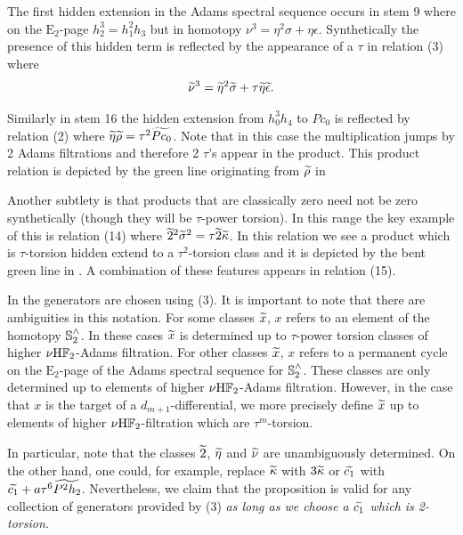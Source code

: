 \begin{rmk} \label{rmk:subtle-mult}
  The first hidden extension in the Adams spectral sequence occurs in stem 9 where on the $\mathrm{E}_2$-page $h_2^3 = h_1^2h_3$ but in homotopy $\nu^3 = \eta^2\sigma + \eta\epsilon$. Synthetically the presence of this hidden term is reflected by the appearance of a $\tau$ in relation (3) where
  \[ \wt{\nu}^3 = \wt{\eta}^2 \wt{\sigma} + \tau \wt{\eta} \wt{\epsilon}. \]

  Similarly in stem 16 the hidden extension from $h_0^3h_4$ to $Pc_0$ is reflected by relation (2) where $ \wt{\eta} \wt{\rho}  = \tau^2 \wt{Pc_0} $. Note that in this case the multiplication jumps by 2 Adams filtrations and therefore 2 $\tau$'s appear in the product. This product relation is depicted by the green line originating from $\wt{\rho}$ in 

  Another subtlety is that products that are classically zero need not be zero synthetically (though they will be $\tau$-power torsion). In this range the key example of this is relation (14) where $\wt{2}^2 \wt{\sigma}^2 = \tau \wt{2} \wt{\kappa}$. In this relation we see a product which is $\tau$-torsion hidden extend to a $\tau^2$-torsion class and it is depicted by the bent green line in . A combination of these features appears in relation (15). 
\end{rmk}


\begin{rmk}
In  the generators are chosen using (3).
It is important to note that there are ambiguities in this notation.
For some classes $\wt{x}$, $x$ refers to an element of the homotopy $\operatorname{\mathbb{S}}^{\wedge}_2$.  In these cases $\wt{x}$ is determined up to $\tau$-power torsion classes of higher $\nu \mathrm{H}\mathbb{F}_2$-Adams filtration.
For other classes $\wt{x}$, $x$ refers to a permanent cycle on the $\mathrm{E}_2$-page of the Adams spectral sequence for $\operatorname{\mathbb{S}}^{\wedge}_2$.  These classes are only determined up to elements of higher $\nu \mathrm{H}\mathbb{F}_2$-Adams filtration.  However, in the case that $x$ is the target of a $d_{m+1}$-differential, we more precisely define $\wt{x}$ up to elements of higher $\nu \mathrm{H}\mathbb{F}_2$-filtration which are $\tau^m$-torsion.

In particular, note that the classes $\wt{2}$, $\wt{\eta}$ and $\wt{\nu}$ are unambiguously determined. On the other hand, one could, for example, replace $\wt{\kappa}$ with $3\wt{\kappa}$ or $\wt{c_1}$ with $\wt{c_1} + a\tau^6 \wt{P^2h_2}$. Nevertheless, we claim that the proposition is valid for any collection of generators provided by (3) \emph{as long as we choose a $\wt{c_1}$ which is 2-torsion.}
\end{rmk}

